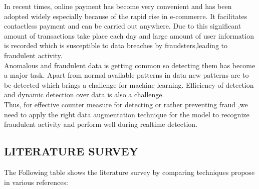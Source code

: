 \documentclass[a4paper, 12pt]{article}
\begin{document}
\hspace{1cm}
In recent times, online payment has become very convenient and has been adopted widely especially because of the rapid rise in e-commerce. It facilitates contactless payment and can be carried out anywhere. Due to this significant amount of transactions take place each day and large amount of user information is recorded which is susceptible to data breaches by fraudsters,leading to fraudulent activity. \\

\hspace{1cm} Anomalous and fraudulent data is getting common so detecting them has become a major task. Apart from normal available patterns in data new patterns are to be detected which brings a challenge for machine learning. Efficiency of detection and dynamic detection over data is also a challenge.
\\

\hspace{1cm} Thus, for effective counter measure for detecting or rather preventing fraud ,we need to apply the right data augmentation technique for the model to recognize fraudulent activity and perform well during realtime detection.\\

\newpage
\begin{center}

\section{LITERATURE SURVEY}

\end{center}

The Following table shows the literature survey by comparing techniques propose in various references:
\end{document}
